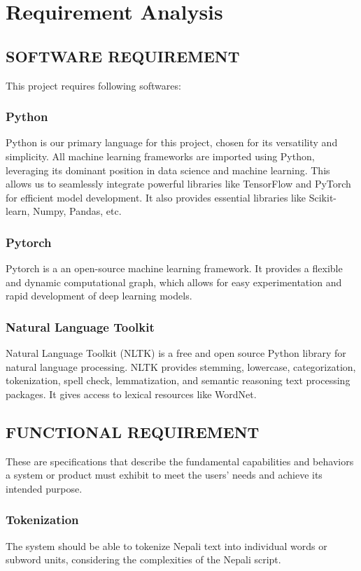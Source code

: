      \chapter{Requirement Analysis}
        \section{SOFTWARE REQUIREMENT}
            This project requires following softwares:
            \subsection*{Python} 
            Python is our primary language for this project, chosen for its versatility and simplicity. All machine learning frameworks are imported using Python, leveraging its dominant position in data science and machine learning. This allows us to seamlessly integrate powerful libraries like TensorFlow and PyTorch for efficient model development. It also provides essential libraries like Scikit-learn, Numpy, Pandas, etc.
        
            \subsection*{Pytorch}
            Pytorch is a an open-source machine learning framework. It provides a flexible and dynamic computational graph, which allows for easy experimentation and rapid development of deep learning models. 

            \subsection*{Natural Language Toolkit}
            Natural Language Toolkit (NLTK) is a free and open source Python library for natural language processing. NLTK provides stemming, lowercase, categorization, tokenization, spell check, lemmatization, and semantic reasoning text processing packages. It gives access to lexical resources like WordNet.

        \section{FUNCTIONAL REQUIREMENT}
            These are specifications that describe the fundamental capabilities and behaviors a system or product must exhibit to meet the users' needs and achieve its intended purpose. 

            \subsection{Tokenization}
            The system should be able to tokenize Nepali text into individual words or subword units, considering the complexities of the Nepali script.

